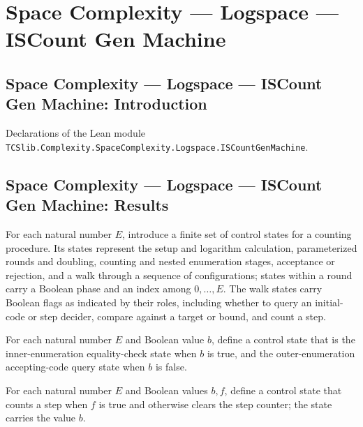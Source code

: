 \section{Space Complexity --- Logspace --- ISCount Gen Machine}
\subsection*{Space Complexity --- Logspace --- ISCount Gen Machine: Introduction}

Declarations of the Lean module \texttt{TCSlib.Complexity.SpaceComplexity.Logspace.ISCountGenMachine}.

\subsection*{Space Complexity --- Logspace --- ISCount Gen Machine: Results}

\begin{definition}
\label{Complexity.LogProg.ISGen.GLb}
\leanok
For each natural number $E$, introduce a finite set of control states for a counting
procedure. Its states represent the setup and logarithm calculation, parameterized
rounds and doubling, counting and nested enumeration stages, acceptance or rejection,
and a walk through a sequence of configurations; states within a round carry a Boolean
phase and an index among $0,\ldots,E$. The walk states carry Boolean flags as indicated
by their roles, including whether to query an initial-code or step decider, compare
against a target or bound, and count a step.
\end{definition}

\begin{definition}
\label{Complexity.LogProg.ISGen.gwX}
\leanok
{}
For each natural number $E$ and Boolean value $b$, define a control state that is the
inner-enumeration equality-check state when $b$ is true, and the outer-enumeration
accepting-code query state when $b$ is false.
\end{definition}

\begin{definition}
\label{Complexity.LogProg.ISGen.gwcX}
\leanok
{}
For each natural number $E$ and Boolean values $b,f$, define a control state that counts
a step when $f$ is true and otherwise clears the step counter; the state carries the
value $b$.
\end{definition}

